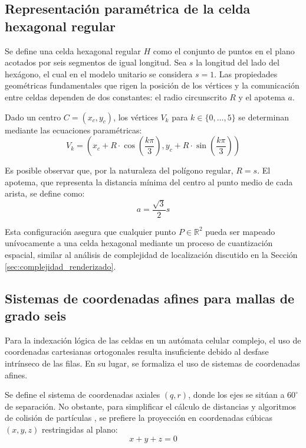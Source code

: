 \subsection{Representación paramétrica de la celda hexagonal regular}
\label{subsec:parametrizacion}

Se define una celda hexagonal regular $H$ como el conjunto de puntos en el plano acotados por seis segmentos de igual longitud. Sea $s$ la longitud del lado del hexágono, el cual en el modelo unitario se considera $s=1$. Las propiedades geométricas fundamentales que rigen la posición de los vértices y la comunicación entre celdas dependen de dos constantes: el radio circunscrito $R$ y el apotema $a$.

Dado un centro $C = (x_c, y_c)$, los vértices $V_k$ para $k \in \{0, \dots, 5\}$ se determinan mediante las ecuaciones paramétricas:
\begin{equation}
    V_k = \left( x_c + R \cdot \cos\left( \frac{k\pi}{3} \right), y_c + R \cdot \sin\left( \frac{k\pi}{3} \right) \right)
    \label{eq:vertices_hexagono}
\end{equation}

Es posible observar que, por la naturaleza del polígono regular, $R = s$. El apotema, que representa la distancia mínima del centro al punto medio de cada arista, se define como:
\begin{equation}
    a = \frac{\sqrt{3}}{2} s
    \label{eq:apotema}
\end{equation}

Esta configuración asegura que cualquier punto $P \in \mathbb{R}^2$ pueda ser mapeado unívocamente a una celda hexagonal mediante un proceso de cuantización espacial, similar al análisis de complejidad de localización discutido en la Sección \ref{sec:complejidad_renderizado}.

\subsection{Sistemas de coordenadas afines para mallas de grado seis}
\label{subsec:coordenadas_afines}

Para la indexación lógica de las celdas en un autómata celular complejo, el uso de coordenadas cartesianas ortogonales resulta insuficiente debido al desfase intrínseco de las filas. En su lugar, se formaliza el uso de sistemas de coordenadas afines. 

Se define el sistema de coordenadas axiales $(q, r)$, donde los ejes se sitúan a $60^\circ$ de separación. No obstante, para simplificar el cálculo de distancias y algoritmos de colisión de partículas \cite{Basurto2009}, se prefiere la proyección en coordenadas cúbicas $(x, y, z)$ restringidas al plano:
\begin{equation}
    x + y + z = 0
    \label{eq:restriccion_cubica}
\end{equation}

